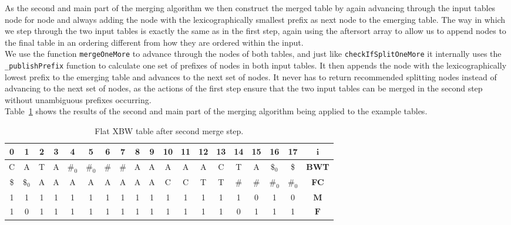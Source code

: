 \documentclass[a4paper,12pt,twoside,BCOR=10mm]{scrbook}
\begin{document}
As the second and main part of the merging algorithm
we then construct the merged table by again advancing through the
input tables node for node and always adding the node with the lexicographically smallest prefix
as next node to the emerging table. The way in which we step through the two input tables
is exactly the same as in the first step, again using the aftersort array to allow us to
append nodes to the final table in an ordering different from how they are
ordered within the input. \\
We use the function \texttt{mergeOneMore} to advance through the nodes of both tables,
and just like \texttt{checkIfSplitOneMore} it internally uses the \texttt{\_publishPrefix} function
to calculate one set of prefixes of nodes in both input tables.
It then appends the node with the lexicographically lowest prefix to the emerging table
and advances to the next set of nodes.
It never has to return recommended splitting nodes instead of advancing to the next
set of nodes, as the actions of the first step ensure that the two input tables
can be merged in the second step without unambiguous prefixes occurring. \\
Table~\ref{table:evo_fig_flat_merge_step_two} shows the results of the
second and main part of the merging algorithm being applied
to the example tables.

\begin{table}[htb]
\centering
\caption[Flat XBW table after second merge step]{Flat XBW table after second merge step.}
{
\renewcommand{\tabcolsep}{5pt}
\begin{tabular}{ | c | c | c | c | c | c | c | c | c | c | c | c | c | c | c | c | c | c | c | }
\hline
0 & 1 & 2 & 3 & 4 & 5 & 6 & 7 & 8 & 9 & 10 & 11 & 12 & 13 & 14 & 15 & 16 & 17 & $\boldsymbol{i}$ \\ \hline
C & A & T & A & $\#_0$ & $\#_0$ & $\#$ & $\#$ & A & A & A & A & A & C & T & A & $\$_0$ & \$ & \textbf{BWT} \\ \hline
\$ & $\$_0$ & A & A & A & A & A & A & A & A & C & C & T & T & $\#$ & $\#$ & $\#_0$ & $\#_0$ & \textbf{FC} \\ \hline
1 & 1 & 1 & 1 & 1 & 1 & 1 & 1 & 1 & 1 & 1 & 1 & 1 & 1 & 1 & 0 & 1 & 0 & $\boldsymbol{M}$ \\ \hline
1 & 0 & 1 & 1 & 1 & 1 & 1 & 1 & 1 & 1 & 1 & 1 & 1 & 1 & 0 & 1 & 1 & 1 & $\boldsymbol{F}$ \\ \hline
\end{tabular}
}
\label{table:evo_fig_flat_merge_step_two}
\end{table}
\end{document}
